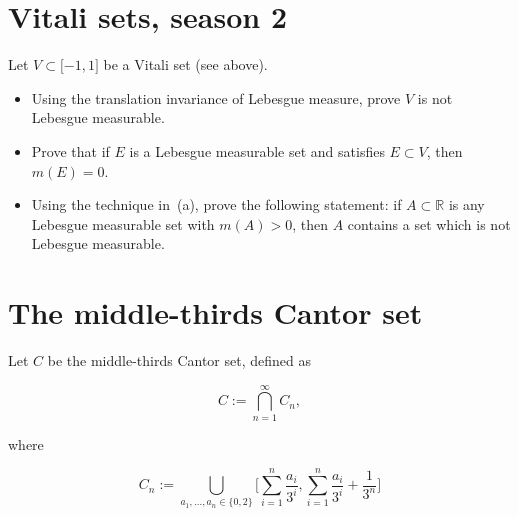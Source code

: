 \documentclass{qlnotes-export}
\begin{document}
\section{Vitali sets, season 2}\label{vitali-sets-season-2}

Let \(V \subset \lbrack - 1,1\rbrack\) be a Vitali set (see above).

\begin{itemize}
\item
  Using the translation invariance of Lebesgue measure, prove \(V\) is not Lebesgue measurable.
\item
  Prove that if \(E\) is a Lebesgue measurable set and satisfies \(E \subset V\), then \(m(E) = 0\).
\item
  Using the technique in~(a), prove the following statement: if \(A \subset {\mathbb{R}}\) is any Lebesgue measurable set with \(m(A) > 0\), then \(A\) contains a set which is not Lebesgue measurable.
\end{itemize}

\section{The middle-thirds Cantor set}\label{the-middle-thirds-cantor-set}

Let \(C\) be the middle-thirds Cantor set, defined as

\[C := \bigcap\limits_{n = 1}^{\infty}C_{n},\]

where

\[C_{n} := \bigcup\limits_{a_{1},\ldots,a_{n} \in {\{{0,2}\}}}\lbrack\sum\limits_{i = 1}^{n}\frac{a_{i}}{3^{i}},\sum\limits_{i = 1}^{n}\frac{a_{i}}{3^{i}} + \frac{1}{3^{n}}\rbrack\]
\end{document}
